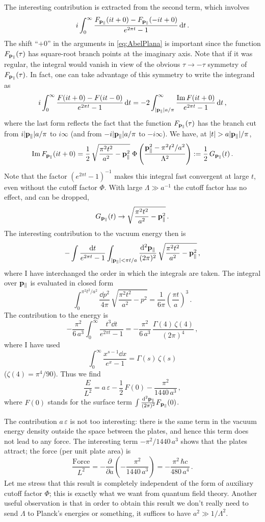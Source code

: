 The interesting contribution is extracted from the second term, which involves
\[
i\int_0^\infty\frac{F_{\mathbf{p}_\parallel}(it+0)-F_{\mathbf{p}_\parallel}(-it+0)}{e^{2\pi t}-1}\mathop{}\!\mathrm{d} t\,.
\]
The shift ``$+0$'' in the arguments in \eqref{eq:AbelPlana} is important
since the function $F_{\mathbf{p}_\parallel}(\tau)$ has square-root branch points at
the imaginary axis. Note that if it was regular, the integral would vanish in
view of the obvious $\tau\to-\tau$ symmetry of $F_{\mathbf{p}_\parallel}(\tau)$. In
fact, one can take advantage of this symmetry to write the integrand as
\[
i\int_0^\infty\frac{F(it+0)-F(it-0)}{e^{2\pi t}-1}\mathop{}\!\mathrm{d} t
=-2\int_{|\mathbf{p}_\parallel|a/\pi}^\infty\frac{\operatorname{Im} F(it+0)}{e^{2\pi t}-1}\mathop{}\!\mathrm{d} t\,,
\]
where the last form reflects the fact that the function
$F_{\mathbf{p}_\parallel}(\tau)$ has the branch cut from $i|\mathbf{p}_\parallel|a/\pi$ to
$i\infty$ (and from $-i|\mathbf{p}_\parallel|a/\pi$ to $-i\infty$). We have, at
$|t|>a|\pp_\parallel|/\pi$,
\[
\operatorname{Im} F_{\mathbf{p}_\parallel}(it+0)=\frac12\,\sqrt{\frac{\pi^2t^2}{a^2}-\mathbf{p}_\parallel^2}\;
\Phi\left(\frac{\mathbf{p}_\parallel^2-\pi^2t^2/a^2}{\Lambda^2}\right):=\frac12\,G_{\mathbf{p}_\parallel}(t)\,.
\]
Note that the factor $(e^{2\pi t}-1)^{-1}$ makes this integral fast
convergent at large $t$, even without the cutoff factor $\Phi$. With large
$\Lambda\gg a^{-1}$ the cutoff factor has no effect, and can be dropped,
\[
G_{\mathbf{p}_\parallel}(t)\to\sqrt{\frac{\pi^2t^2}{a^2}-\mathbf{p}_\parallel^2}\,.
\]
The interesting contribution to the vacuum energy then is
\[
-\int\frac{\mathop{}\!\mathrm{d} t}{e^{2\pi t}-1}\int_{|\mathbf{p}_\parallel|<\pi t/a}\frac{\mathop{}\!\mathrm{d}^2\mathbf{p}_\parallel}{(2\pi)^2}\,
\sqrt{\frac{\pi^2t^2}{a^2}-\mathbf{p}_\parallel^2}\,,
\]
where I have interchanged the order in which the integrals are taken. The
integral over $\mathbf{p}_\parallel$ is evaluated in closed form
\[
\int_0^{\pi^2t^2/a^2}\frac{\dd p^2}{4\pi}\,\sqrt{\frac{\pi^2t^2}{a^2}-p^2}=\frac1{6\pi}\left(\frac{\pi t}{a}\right)^3\,.
\]
The contribution to the energy is
\[
-\frac{\pi^2}{6\,a^3}\int_0^\infty\frac{t^3\dd t}{e^{2\pi t}-1}=-\frac{\pi^2}{6\,a^3}\,\frac{\Gamma(4)\,\zeta(4)}{(2\pi)^4}\,,
\]
where I have used
\[
\int_0^\infty\frac{x^{s-1}\dd x}{e^x-1}=\Gamma(s)\,\zeta(s)
\]
($\zeta(4)=\pi^4/90$). Thus we find
\[
\frac{E}{L^2}=a\,\varepsilon-\frac12\,F(0)-\frac{\pi^2}{1440\,a^3}\,,
\]
where $F(0)$ stands for the surface term $\int\frac{\mathop{}\!\mathrm{d}^2\mathbf{p}_\parallel}{(2\pi)^2}F_{\mathbf{p}_\parallel}(0)$.

The contribution $a\,\varepsilon$ is not too interesting: there is the same
term in the vacuum energy density outside the space between the plates, and
hence this term does not lead to any force. The interesting term
$-\pi^2/1440\,a^3$ shows that the plates attract; the force (per unit plate
area) is
\[
\frac{\text{Force}}{L^2}=-\frac{\partial}{\partial a}\left(-\frac{\pi^2}{1440\,a^3}\right)=-\frac{\pi^2\,\hbar c}{480\,a^4}\,.
\]
Let me stress that this result is completely independent of the form of
auxiliary cutoff factor $\Phi$; this is exactly what we want from quantum
field theory. Another useful observation is that in order to obtain this
result we don't really need to send $\Lambda$ to Planck's energies or
something, it suffices to have $a^2\gg1/\Lambda^2$.

